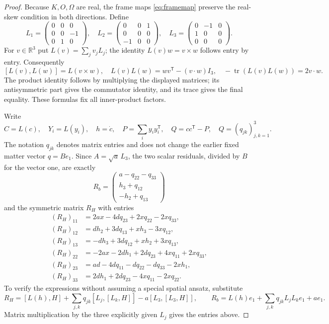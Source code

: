 \documentclass[11pt]{article}
\newcommand{\tr}{\operatorname{tr}}
\begin{document}
\begin{proof}
Because $K,O,\Omega$ are real, the frame maps \eqref{eq:framemap}
preserve the real-skew condition in both directions. Define
\[
 L_1=\begin{pmatrix}0&0&0\\0&0&-1\\0&1&0\end{pmatrix},\quad
 L_2=\begin{pmatrix}0&0&1\\0&0&0\\-1&0&0\end{pmatrix},\quad
 L_3=\begin{pmatrix}0&-1&0\\1&0&0\\0&0&0\end{pmatrix}.
\]
For $v\in\mathbb R^3$ put $L(v)=\sum_jv_jL_j$; the identity
$L(v)w=v\times w$ follows entry by entry. Consequently
\[
 [L(v),L(w)]=L(v\times w),\quad
 L(v)L(w)=wv^{\mathsf T}-(v\cdot w)I_3,\quad
 -\tr(L(v)L(w))=2v\cdot w.
\]
The product identity follows by multiplying the displayed matrices; its
antisymmetric part gives the commutator identity, and its trace gives
the final equality. These formulas fix all inner-product factors.

Write
\[
 C=L(c),\quad Y_i=L(y_i),\quad h=\dot c,\quad
 P=\sum_i y_i y_i^{\mathsf T},\quad Q=cc^{\mathsf T}-P,
 \quad Q=(q_{jk})_{j,k=1}^3.
\]
The notation $q_{jk}$ denotes matrix entries and does not change the
earlier fixed matter vector $q=Be_1$.
Since $A=\sqrt a\,L_3$, the two scalar residuals, divided by $B$ for
the vector one, are exactly
\[
 R_b=\begin{pmatrix}a-q_{22}-q_{33}\\h_3+q_{12}\\-h_2+q_{13}\end{pmatrix}
\]
and the symmetric matrix $R_H$ with entries
\begin{align*}
 (R_H)_{11}&=2ax-4dq_{23}+2xq_{22}-2xq_{33},\\
 (R_H)_{12}&=dh_2+3dq_{13}+xh_3-3xq_{12},\\
 (R_H)_{13}&=-dh_3+3dq_{12}+xh_2+3xq_{13},\\
 (R_H)_{22}&=-2ax-2dh_1+2dq_{23}+4xq_{11}+2xq_{33},\\
 (R_H)_{23}&=ad-4dq_{11}-dq_{22}-dq_{33}-2xh_1,\\
 (R_H)_{33}&=2dh_1+2dq_{23}-4xq_{11}-2xq_{22}.
\end{align*}
To verify the expressions without assuming a special spatial ansatz,
substitute
\[
 R_H=[L(h),H]+\sum_{j,k}q_{jk}[L_j,[L_k,H]]
                -a[L_3,[L_3,H]],\qquad
 R_b=L(h)e_1+\sum_{j,k}q_{jk}L_jL_ke_1+ae_1.
\]
Matrix multiplication by the three explicitly given $L_j$ gives the
entries above.


\end{proof}
\end{document}
